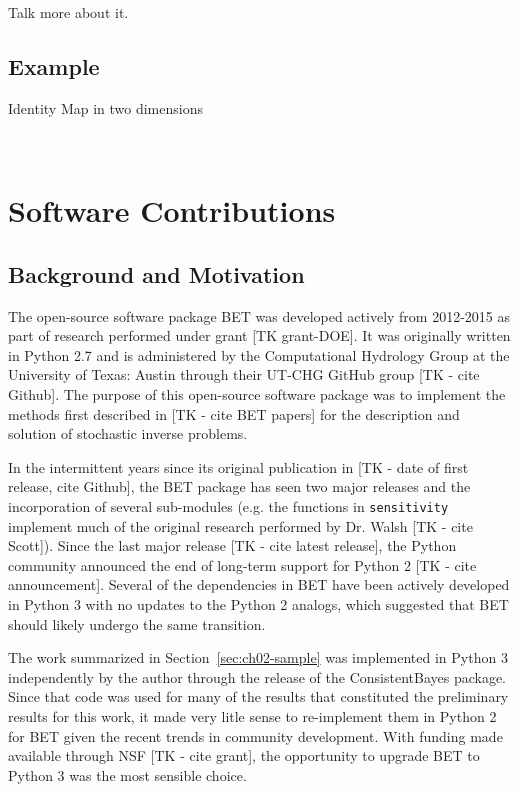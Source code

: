 Talk more about it.

\vspace{2in}

\subsection{Example}\label{sec:sample-example}
Identity Map in two dimensions
\vspace{3in}


\
\section{Software Contributions}\label{sec:ch02-software}

\subsection{Background and Motivation}
The open-source software package BET was developed actively from 2012-2015 as part of research performed under grant [TK grant-DOE].
It was originally written in Python 2.7 and is administered by the Computational Hydrology Group at the University of Texas: Austin through their UT-CHG GitHub group [TK - cite Github]. 
The purpose of this open-source software package was to implement the methods first described in [TK - cite BET papers] for the description and solution of stochastic inverse problems. 

In the intermittent years since its original publication in [TK - date of first release, cite Github], the BET package has seen two major releases and the incorporation of several sub-modules (e.g. the functions in {\tt sensitivity} implement much of the original research performed by Dr. Walsh [TK - cite Scott]). 
Since the last major release [TK - cite latest release], the Python community announced the end of long-term support for Python 2 [TK - cite announcement]. 
Several of the dependencies in BET have been actively developed in Python 3 with no updates to the Python 2 analogs, which suggested that BET should likely undergo the same transition.

The work summarized in Section~\ref{sec:ch02-sample} was implemented in Python 3 independently by the author through the release of the ConsistentBayes package.
Since that code was used for many of the results that constituted the preliminary results for this work, it made very litle sense to re-implement them in Python 2 for BET given the recent trends in community development. 
With funding made available through NSF [TK - cite grant], the opportunity to upgrade BET to Python 3 was the most sensible choice. 

